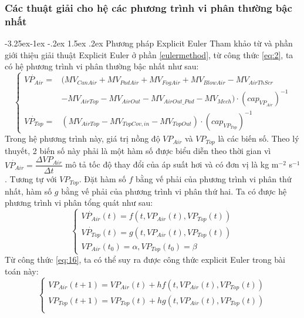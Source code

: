 \documentclass[a4paper]{article}
\makeatletter
\newcounter {subsubsubsection}[subsubsection]
\newcommand\subsubsubsection{\@startsection{subsubsubsection}{4}{\z@}%
                                     {-3.25ex\@plus -1ex \@minus -.2ex}%
                                     {1.5ex \@plus .2ex}%
                                     {\normalfont\normalsize\bfseries}}
\makeatother
\begin{document}
\subsubsection{Các thuật giải cho hệ các phương trình vi phân thường bậc nhất}
\subsubsubsection{Phương pháp Explicit Euler}
Tham khảo từ \cite{EG96} và phần giới thiệu giải thuật Explicit Euler ở phần \ref{eulermethod}, từ công thức \eqref{eq:2}, ta có hệ phương trình vi phân thường bậc nhất như sau:
\begin{equation}
\begin{cases}
       \dot{VP_{Air}} = & (MV_{CanAir} + MV_{PadAir} + MV_{FogAir} + MV_{BlowAir} - MV_{AirThScr} \\
         &- MV_{AirTop}-MV_{AirOut}-MV_{AirOut\_Pad}-MV_{Mech}) \cdot  (cap_{VP_{Air}})^{-1} \\
       \dot{VP_{Top}} = & (MV_{AirTop} - MV_{TopCov,in} - MV_{TopOut}) \cdot (cap_{VP_{Top}})^{-1} 
    \end{cases}
\end{equation}
Trong hệ phương trình này, giá trị nồng độ $VP_{Air}$ và $VP_{Top}$ là các biến số. Theo lý thuyết, 2 biến số này phải là một hàm số được biểu diễn theo thời gian vì $\dot{VP_{Air}} = \dfrac{\Delta VP_{Air}}{ \Delta t}$ mô tả tốc độ thay đổi của áp suất hơi và có đơn vị là kg m$^{-2}$ s$^{-1}$ . Tương tự với $VP_{Top}$. Đặt hàm số $f$ bằng vế phải của phương trình vi phân thứ nhất, hàm số $g$ bằng vế phải của phương trình vi phân thứ hai. Ta có được hệ phương trình vi phân tổng quát như sau:
\begin{equation}\label{eq:202}
\begin{cases}
    \dot{VP_{Air}}(t) = f(t, VP_{Air}(t), VP_{Top}(t)) \\
    \dot{VP_{Top}}(t) = g(t, VP_{Air}(t), VP_{Top}(t)) \\
    VP_{Air}(t_0) = \alpha, VP_{Top}(t_0) = \beta
\end{cases}
\end{equation}
Từ công thức \eqref{eq:16}, ta có thể suy ra được công thức explicit Euler trong bài toán này: \\
\begin{equation}
\begin{cases}
    VP_{Air}(t+1) = VP_{Air}(t) + hf(t, VP_{Air}(t), VP_{Top}(t)) \\
    VP_{Top}(t+1) = VP_{Top}(t) + hg(t, VP_{Air}(t), VP_{Top}(t)) \\
\end{cases}
\end{equation}
\end{document}
